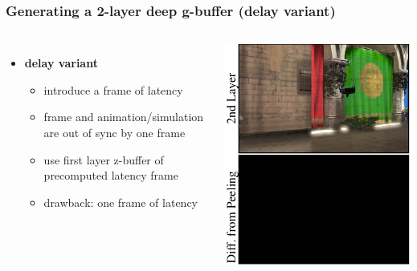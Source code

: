 \documentclass[aspectratio=169]{beamer}
\begin{document}
	\begin{frame}
		\frametitle{Generating a 2-layer deep g-buffer (delay variant)}
		\begin{columns}
				\begin{itemize}
					\item \textbf{delay variant}
						\begin{itemize}
							\item introduce a frame of latency
							\item frame and animation/simulation are out of sync by one frame
							\item use first layer z-buffer of precomputed latency frame 
							\item drawback: one frame of latency
						\end{itemize}
				\end{itemize}
				\includegraphics[height=.9\textwidth]{img/delay.png}
		\end{columns}
	\end{frame}	
\end{document}
